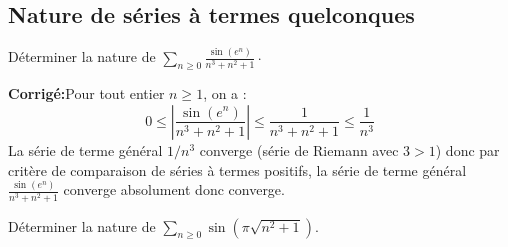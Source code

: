 \documentclass[a4paper,twoside,french,10pt]{VcCours}
\newcommand{\corr}{\textbf{Corrigé:}}
\newcommand{\Sum}[2]{\ensuremath{\textstyle{\sum\limits_{#1}^{#2}}}}
\begin{document}
\medskip

\subsection{Nature de séries à termes quelconques}

\medskip

\begin{Exercice}{} Déterminer la nature de $\Sum{n \geq 0}{} \frac{\sin(e^n)}{n^3+n^2+1} \cdot$
\end{Exercice}

\corr Pour tout entier $n \geq 1$, on a :
\begin{equation}\label{ineg1}
0 \leq \left\vert \frac{\sin(e^n)}{n^3+n^2+1} \right\vert \leq \frac{1}{n^3+n^2+1} \leq \dfrac{1}{n^3}
\end{equation}
La série de terme général $1/n^3$ converge (série de Riemann avec $3>1$) donc par critère de comparaison de séries à termes positifs, la série de terme général $\frac{\sin(e^n)}{n^3+n^2+1}$ converge absolument donc converge.

\medskip

\begin{Exercice}{} Déterminer la nature de $\Sum{n \geq 0}{} \sin \left({\pi \sqrt {n^2 + 1}} \right)$.
\end{Exercice}
\end{document}

